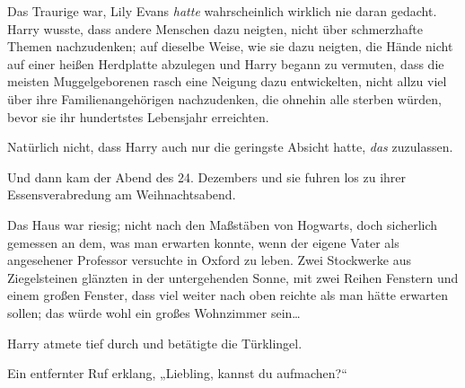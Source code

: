 Das Traurige war, Lily Evans \emph{hatte} wahrscheinlich wirklich nie daran gedacht. Harry wusste, dass andere Menschen dazu neigten, nicht über schmerzhafte Themen nachzudenken; auf dieselbe Weise, wie sie dazu neigten, die Hände nicht auf einer heißen Herdplatte abzulegen und Harry begann zu vermuten, dass die meisten Muggelgeborenen rasch eine Neigung dazu entwickelten, nicht allzu viel über ihre Familienangehörigen nachzudenken, die ohnehin alle sterben würden, bevor sie ihr hundertstes Lebensjahr erreichten.

Natürlich nicht, dass Harry auch nur die geringste Absicht hatte, \emph{das} zuzulassen.

Und dann kam der Abend des 24. Dezembers und sie fuhren los zu ihrer Essensverabredung am Weihnachtsabend.

\later

Das Haus war riesig; nicht nach den Maßstäben von Hogwarts, doch sicherlich gemessen an dem, was man erwarten konnte, wenn der eigene Vater als angesehener Professor versuchte in Oxford zu leben. Zwei Stockwerke aus Ziegelsteinen glänzten in der untergehenden Sonne, mit zwei Reihen Fenstern und einem großen Fenster, dass viel weiter nach oben reichte als man hätte erwarten sollen; das würde wohl ein großes Wohnzimmer sein…

Harry atmete tief durch und betätigte die Türklingel.

Ein entfernter Ruf erklang,
„Liebling, kannst du aufmachen?“

